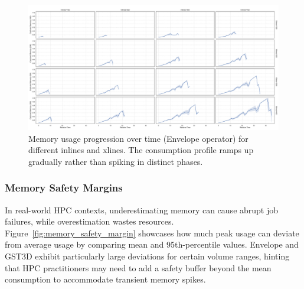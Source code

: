 \begin{figure}[htbp]
    \centering
    \includegraphics[width=\textwidth]{assets/images/05/inline_xline_memory_usage_progression_envelope}
    \caption{Memory usage progression over time (Envelope operator) for different inlines and xlines.
    The consumption profile ramps up gradually rather than spiking in distinct phases.
    \label{fig:inline_xline_memory_usage_progression_envelope}
    }
\end{figure}

\subsubsection{Memory Safety Margins}
\label{subsec:memory-safety-margins}

In real-world \ac{HPC} contexts, underestimating memory can cause abrupt job failures, while overestimation wastes resources.
Figure~\ref{fig:memory_safety_margin} showcases how much peak usage can deviate from average usage by comparing mean and 95th-percentile values.
Envelope and \ac{GST3D} exhibit particularly large deviations for certain volume ranges, hinting that HPC practitioners may need to add a safety buffer beyond the mean consumption to accommodate transient memory spikes.


